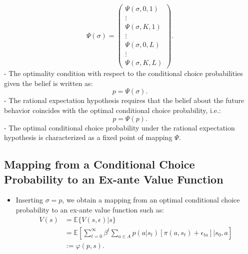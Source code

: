 \documentclass[
]{book}
\providecommand{\tightlist}{%
  \setlength{\itemsep}{0pt}\setlength{\parskip}{0pt}}
\begin{document}
\begin{equation}
\Psi(\sigma) = 
\begin{pmatrix}
\Psi(\sigma, 0, 1)\\
\vdots\\
\Psi(\sigma, K, 1)\\
\vdots\\
\Psi(\sigma, 0, L)\\
\vdots\\
\Psi(\sigma, K, L)
\end{pmatrix}.
\end{equation}
- The optimality condition with respect to the conditional choice probabilities given the belief is written as:
\begin{equation}
p = \Psi(\sigma).
\end{equation}
- The rational expectation hypothesis requires that the belief about the future behavior coincides with the optimal conditional choice probability, i.e.:
\begin{equation}
p = \Psi(p).
\end{equation}
- The optimal conditional choice probability under the rational expectation hypothesis is characterized as a fixed point of mapping \(\Psi\).

\hypertarget{mapping-from-a-conditional-choice-probability-to-an-ex-ante-value-function}{%
\subsection{Mapping from a Conditional Choice Probability to an Ex-ante Value Function}\label{mapping-from-a-conditional-choice-probability-to-an-ex-ante-value-function}}

\begin{itemize}
\tightlist
\item
  Inserting \(\sigma = p\), we obtain a mapping from an optimal conditional choice probability to an ex-ante value function such as:
  \begin{equation}
  \begin{split}
  V(s) &= \mathbb{E}\{V(s, \epsilon)|s\}\\
  &= \mathbb{E}\left[ \sum_{t = 0}^\infty \beta^t \sum_{a \in A}p(a|s_t)\left[\pi(a, s_t) + \epsilon_{ta}\right]\Bigg|s_0, a\right]\\
  &:= \varphi(p, s).
  \end{split}
  \end{equation}
\end{itemize}
\end{document}
